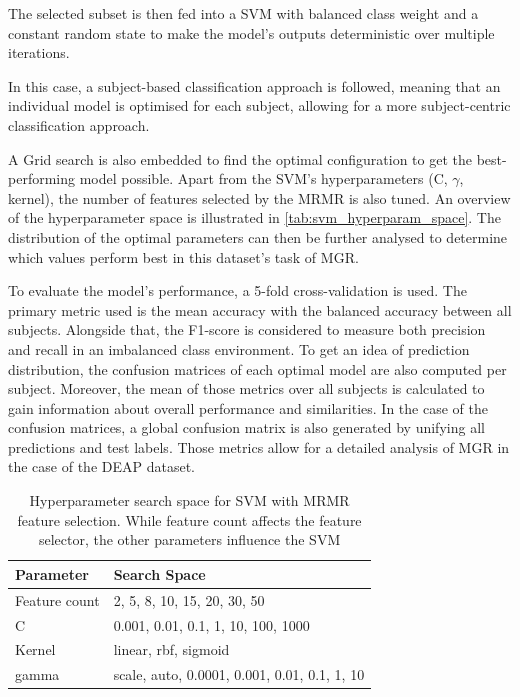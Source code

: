       The selected subset is then fed into a \ac{SVM} with balanced class weight and a constant random state to make the model's outputs deterministic over multiple iterations. \par
      In this case, a subject-based classification approach is followed, meaning that an individual model is optimised for each subject, allowing for a more subject-centric classification approach. \par
      A Grid search is also embedded to find the optimal configuration to get the best-performing model possible. Apart from the \ac{SVM}'s hyperparameters (C, $\gamma$, kernel), the number of features selected by the \ac{MRMR} is also tuned. An overview of the hyperparameter space is illustrated in \autoref{tab:svm_hyperparam_space}. The distribution of the optimal parameters can then be further analysed to determine which values perform best in this dataset's task of \ac{MGR}. \par
      To evaluate the model's performance, a 5-fold cross-validation is used. The primary metric used is the mean accuracy with the balanced accuracy between all subjects. Alongside that, the F1-score is considered to measure both precision and recall in an imbalanced class environment. To get an idea of prediction distribution, the confusion matrices of each optimal model are also computed per subject. Moreover, the mean of those metrics over all subjects is calculated to gain information about overall performance and similarities. In the case of the confusion matrices, a global confusion matrix is also generated by unifying all predictions and test labels. Those metrics allow for a detailed analysis of \ac{MGR} in the case of the \ac{DEAP} dataset.
      \begin{table}[h!]
        \centering
        \begin{tabular}{|p{}|p{}|}
          \hline
          \textbf{Parameter} & \textbf{Search Space} \\
          \hline
          Feature count & 2, 5, 8, 10, 15, 20, 30, 50 \\
          \hline
          C & 0.001, 0.01, 0.1, 1, 10, 100, 1000 \\
          \hline
          Kernel & linear, rbf, sigmoid \\
          \hline
          gamma & scale, auto, 0.0001, 0.001, 0.01, 0.1, 1, 10 \\
          \hline
        \end{tabular}
        \caption{Hyperparameter search space for SVM with \ac{MRMR} feature selection. While feature count affects the feature selector, the other parameters influence the \ac{SVM}}
        \label{tab:svm_hyperparam_space}
      \end{table}

